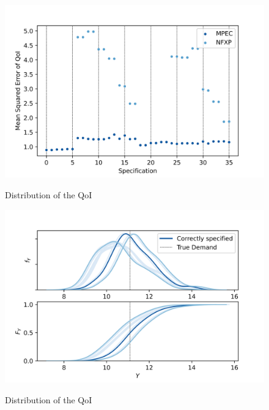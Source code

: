 \begin{figure}[H]
	\caption{Distribution of the QoI}
	\vspace*{-4mm}
	\centering
	\includegraphics[scale=0.9]{../figures/figure_10.png}
	\label{figure10}
\end{figure}

\begin{figure}[H]
	\caption{Distribution of the QoI}
	\vspace*{-4mm}
	\centering
	\includegraphics[scale=0.9]{../figures/figure_11.png}
	\label{figure11}
\end{figure}
